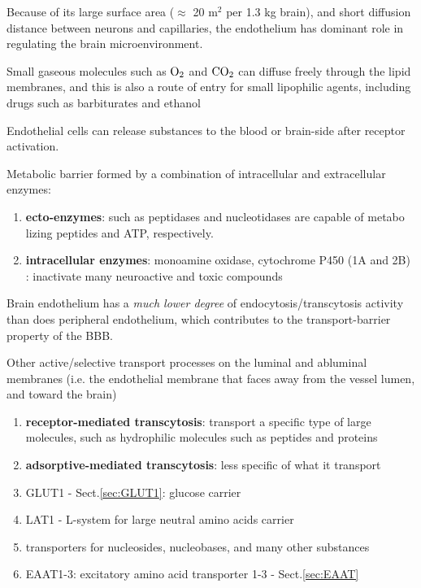 Because of its large surface area ($\approx$ 20 m$^2$ per 1.3 kg brain), and
short diffusion distance between neurons and capillaries, the endothelium has
dominant role in regulating the brain microenvironment.

Small gaseous molecules such as $\ce{O2}$ and $\ce{CO2}$ can diffuse freely
through the lipid membranes, and this is also a route of entry for small
lipophilic agents, including drugs such as barbiturates and ethanol

Endothelial cells can release substances to the blood or brain-side after
receptor activation.

Metabolic barrier formed by a combination of intracellular and extracellular
enzymes:
\begin{enumerate}

  \item {\bf ecto-enzymes}: such as peptidases and nucleotidases are capable of
  metabo lizing peptides and ATP, respectively.

  \item {\bf intracellular enzymes}: monoamine oxidase, cytochrome P450 (1A and
  2B) : inactivate many neuroactive and toxic compounds
\end{enumerate}

\begin{mdframed}

Brain endothelium has a {\it much lower degree} of endocytosis/transcytosis
activity than does peripheral endothelium, which contributes to the transport-barrier
property of the BBB.

\end{mdframed}

Other active/selective transport processes on the luminal
and abluminal membranes (i.e. the endothelial membrane that faces away from the
vessel lumen, and toward the brain)
\begin{enumerate}

  \item {\bf receptor-mediated transcytosis}: transport a specific type of
  large molecules, such as hydrophilic molecules such as peptides and proteins

  \item {\bf adsorptive-mediated transcytosis}: less specific of what it
  transport

  \item GLUT1 - Sect.\ref{sec:GLUT1}: glucose carrier

  \item LAT1 - L-system for large neutral amino acids carrier

  \item transporters for nucleosides, nucleobases, and many other substances

  \item EAAT1-3: excitatory amino acid transporter 1-3 - Sect.\ref{sec:EAAT}
\end{enumerate}


